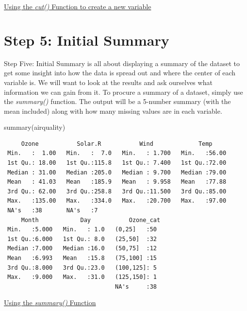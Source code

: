 \documentclass[
  letterpaper,
  DIV=11,
  numbers=noendperiod]{scrreprt}
\newenvironment{Shaded}{\begin{snugshade}}{\end{snugshade}}
\newcommand{\FunctionTok}[1]{\textcolor[rgb]{0.28,0.35,0.67}{#1}}
\newcommand{\NormalTok}[1]{\textcolor[rgb]{0.00,0.23,0.31}{#1}}
\begin{document}
\begin{watch}{}{}
    \href{https://youtu.be/3qMzvNiGmd4}{Using the \textit{cut()} Function to create a new variable}
\end{watch}

\section{Step 5: Initial Summary}\label{step-5-initial-summary}

Step Five: Initial Summary is all about displaying a summary of the
dataset to get some insight into how the data is spread out and where
the center of each variable is. We will want to look at the results and
ask ourselves what information we can gain from it. To procure a summary
of a dataset, simply use the \emph{summary()} function. The output will
be a 5-number summary (with the mean included) along with how many
missing values are in each variable.

\begin{Shaded}
\begin{Highlighting}[]
\FunctionTok{summary}\NormalTok{(airquality)}
\end{Highlighting}
\end{Shaded}

\begin{verbatim}
     Ozone           Solar.R           Wind             Temp      
 Min.   :  1.00   Min.   :  7.0   Min.   : 1.700   Min.   :56.00  
 1st Qu.: 18.00   1st Qu.:115.8   1st Qu.: 7.400   1st Qu.:72.00  
 Median : 31.00   Median :205.0   Median : 9.700   Median :79.00  
 Mean   : 41.03   Mean   :185.9   Mean   : 9.958   Mean   :77.88  
 3rd Qu.: 62.00   3rd Qu.:258.8   3rd Qu.:11.500   3rd Qu.:85.00  
 Max.   :135.00   Max.   :334.0   Max.   :20.700   Max.   :97.00  
 NA's   :38       NA's   :7                                       
     Month            Day           Ozone_cat 
 Min.   :5.000   Min.   : 1.0   (0,25]   :50  
 1st Qu.:6.000   1st Qu.: 8.0   (25,50]  :32  
 Median :7.000   Median :16.0   (50,75]  :12  
 Mean   :6.993   Mean   :15.8   (75,100] :15  
 3rd Qu.:8.000   3rd Qu.:23.0   (100,125]: 5  
 Max.   :9.000   Max.   :31.0   (125,150]: 1  
                                NA's     :38  
\end{verbatim}

\begin{watch}{}{}
    \href{https://youtu.be/lDZzsabI2xw}{Using the \textit{summary()} Function}
\end{watch}
\end{document}
